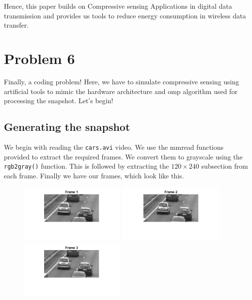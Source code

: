 \documentclass[a4paper,11pt]{article}
\numberwithin{definition}{section}
\numberwithin{mytheorem}{subsection}
\begin{document}
Hence, this paper builds on Compressive sensing Applications in digital data transmission and provides us tools to reduce energy consumption in wireless data transfer.




\newpage

\section{Problem 6}

Finally, a coding problem! Here, we have to simulate compressive sensing using artificial tools to mimic the hardware architecture and omp algorithm used for processing the snapshot. Let's begin!

\subsection{Generating the snapshot}

We begin with reading the \verb|cars.avi| video. We use the mmread functions provided to extract the required frames.
We convert them to grayscale using the \verb|rgb2gray()| function. This is followed by extracting the $120\times240$ subsection from each frame. Finally we have our frames, which look like this.

\begin{figure}[!h]
    \centering
    \includegraphics[width=200px]{"Frame 1.png"}
    \includegraphics[width=200px]{"Frame 2.png"}
    \includegraphics[width=200px]{"Frame 3.png"}
\end{figure}
\end{document}
